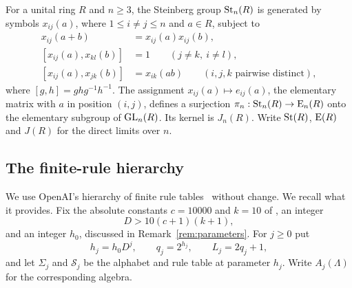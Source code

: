 For a unital ring $R$ and $n\geq3$, the Steinberg group $\operatorname{St}_n(R)$ is generated by symbols $x_{ij}(a)$, where
$1\leq i\neq j\leq n$ and $a\in R$, subject to
\begin{align}
 x_{ij}(a+b)&=x_{ij}(a)x_{ij}(b),\label{eq:st-add}\\
 [x_{ij}(a),x_{kl}(b)]&=1\qquad (j\neq k,\ i\neq l),\label{eq:st-comm}\\
 [x_{ij}(a),x_{jk}(b)]&=x_{ik}(ab)\qquad (i,j,k\text{ pairwise distinct}),\label{eq:st-prod}
\end{align}
where $[g,h]=ghg^{-1}h^{-1}$. The assignment $x_{ij}(a)\mapsto e_{ij}(a)$, the elementary matrix with $a$ in position
$(i,j)$, defines a surjection $\pi_n:\operatorname{St}_n(R)\to\operatorname{E}_n(R)$ onto the elementary subgroup of $\operatorname{GL}_n(R)$. Its kernel is
$J_n(R)$. Write $\operatorname{St}(R)$, $\operatorname{E}(R)$ and $J(R)$ for the direct limits over $n$.

\subsection{The finite-rule hierarchy}

We use OpenAI's hierarchy of finite rule tables~\cite[Section~2]{OAI247periodic} without change. We recall what it
provides. Fix the absolute constants $c=10000$ and $k=10$ of \cite[Proposition~2.2]{OAI247periodic}, an integer
\begin{equation}\label{eq:D}
 D>10(c+1)(k+1),
\end{equation}
and an integer $h_0$, discussed in Remark~\ref{rem:parameters}. For $j\geq0$ put
\[
 h_j=h_0D^j,\qquad q_j=2^{h_j},\qquad L_j=2q_j+1,
\]
and let $\Sigma_j$ and $\mathcal S_j$ be the alphabet and rule table at parameter $h_j$. Write $A_j(\Lambda)$ for the
corresponding algebra.

